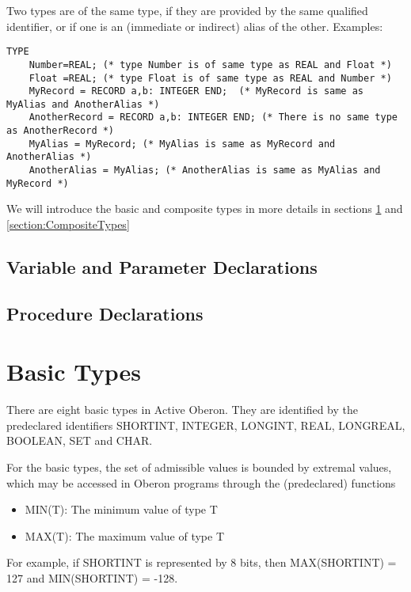 \documentclass[a4paper,11pt]{article}
\begin{document}
Two types are of the same type, if they are provided by the same qualified identifier, or if one is an (immediate or indirect) alias of the other. Examples:
\begin{lstlisting}[language=Oberon,frame=none,caption={Same and different types}]
TYPE
    Number=REAL; (* type Number is of same type as REAL and Float *)
    Float =REAL; (* type Float is of same type as REAL and Number *)
    MyRecord = RECORD a,b: INTEGER END;  (* MyRecord is same as MyAlias and AnotherAlias *)
    AnotherRecord = RECORD a,b: INTEGER END; (* There is no same type as AnotherRecord *)
    MyAlias = MyRecord; (* MyAlias is same as MyRecord and AnotherAlias *)
    AnotherAlias = MyAlias; (* AnotherAlias is same as MyAlias and MyRecord *)
\end{lstlisting}

We will introduce the basic and composite types in more details in sections \ref{section:BasicTypes} and \ref{section:CompositeTypes}

\subsection{Variable and Parameter Declarations}

\subsection{Procedure Declarations}

\section{Basic Types}\label{section:BasicTypes}
There are eight basic types in Active Oberon. They are identified by the predeclared identifiers SHORTINT, INTEGER, LONGINT, REAL, LONGREAL, BOOLEAN, SET and CHAR.

For the basic types, the set of admissible values is bounded by extremal values, which may be accessed in Oberon programs through the (predeclared) functions
\begin{itemize}
\item[] MIN(T): The minimum value of type T
\item[] MAX(T): The maximum value of type T
\end{itemize}

For example, if SHORTINT is represented by 8 bits, then MAX(SHORTINT) = 127 and MIN(SHORTINT) = -128.
\end{document}
